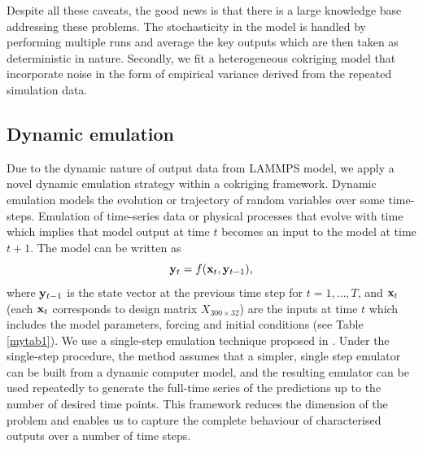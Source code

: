 Despite all these caveats, the good news is that there is a large knowledge base addressing these problems. The stochasticity in the model is handled by performing multiple runs and average the key outputs which are then taken as deterministic in nature. Secondly, we fit a heterogeneous cokriging model that incorporate noise in the form of empirical variance derived from the repeated simulation data.

\subsection{Dynamic emulation}
Due to the dynamic nature of output data from LAMMPS model, we apply a novel dynamic emulation strategy within a cokriging framework. Dynamic emulation models the evolution or trajectory of random variables over some time-steps. Emulation of time-series data or physical processes that evolve with time which implies that model output at time $t$ becomes an input to the model at time $t+1$. The model can be written as 
\begin{equation}\label{dyna3}
{\bf y}_t = f({\bf x}_t, {\bf y}_{t-1}),
\end{equation}
where ${\bf y}_{t-1}$ is the state vector at the previous time step for $t={1,\ldots,T}$, and ${\bf x}_t$ (each ${\bf x}_t$ corresponds to design matrix $X_{300 \times 32}$) are the inputs at time $t$ which includes the model parameters, forcing and initial conditions (see Table \ref{mytab1}). We use a single-step emulation technique proposed in \citet{pd12}. Under the single-step procedure, the method assumes that a simpler, single step emulator can be built from a dynamic computer model, and the resulting emulator can be used repeatedly to generate the full-time series of the predictions up to the number of desired time points. This framework reduces the dimension of the problem and enables us to capture the complete behaviour of characterised outputs over a number of time steps.


